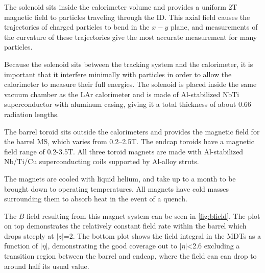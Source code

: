The solenoid sits inside the calorimeter volume and provides a uniform 2T magnetic field to particles traveling through the \ac{ID}. This axial field causes the trajectories of charged particles to bend in the $x-y$ plane, and measurements of the curvature of these trajectories give the most accurate \pt measurement for many particles. 

Because the solenoid sits between the tracking system and the calorimeter, it is important that it interfere minimally with particles in order to allow the calorimeter to measure their full energies. The solenoid is placed inside the same vacuum chamber as the LAr calorimeter and is made of Al-stabilized NbTi superconductor with aluminum casing, giving it a total thickness of about 0.66 radiation lengths. 

The barrel toroid sits outside the calorimeters and provides the magnetic field for the barrel \ac{MS}, which varies from 0.2–2.5T. The endcap toroids have a magnetic field range of 0.2-3.5T. All three toroid magnets are made with Al-stabilized Nb/Ti/Cu superconducting coils supported by Al-alloy struts. 

The magnets are cooled with liquid helium, and take up to a month to be brought down to operating temperatures. All magnets have cold masses surrounding them to absorb heat in the event of a quench. 

The $B$-field resulting from this magnet system can be seen in \autoref{fig:bfield}. The plot on top demonstrates the relatively constant field rate within the barrel which drops steeply at $|z|$=2. The bottom plot shows the field integral in the \acp{MDT} as a function of $|\eta|$, demonstrating the good coverage out to $|\eta|$<2.6 excluding a transition region between the barrel and endcap, where the field can can drop to around half its usual value. 

